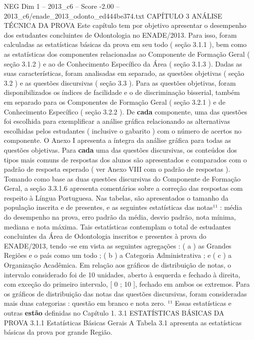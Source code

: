 \begin{textsample}{NEG Dim 1 – 2013\_c6 – Score -2.00 – 2013\_c6/enade\_2013\_odonto\_ed444be374.txt}  \label{ex:f1_neg_265}
CAPÍTULO 3 ANÁLISE TÉCNICA DA PROVA Este capítulo tem por objetivo apresentar o desempenho dos estudantes concluintes de Odontologia no ENADE/2013.
Para isso, foram calculadas as estatísticas básicas da prova em seu todo ( seção 3.1.1 ), bem como as estatísticas dos componentes relacionadas ao Componente de Formação Geral ( seção 3.1.2 ) e ao de Conhecimento Específico da Área ( seção 3.1.3 ).
Dadas as suas características, foram analisadas em separado, as questões objetivas ( seção 3.2 ) e as questões discursivas ( seção 3.3 ).
Para as questões objetivas, foram disponibilizados os índices de facilidade e o de discriminação bisserial, também em separado para os Componentes de Formação Geral ( seção 3.2.1 ) e de Conhecimento Específico ( seção 3.2.2 ).
De \textbf{cada} componente, uma das questões foi escolhida para exemplificar a análise gráfica relacionando as alternativas escolhidas pelos estudantes ( inclusive o gabarito ) com o número de acertos no componente.
O Anexo I apresenta a íntegra da análise gráfica para todas as questões objetivas.
Para \textbf{cada} uma das questões discursivas, os conteúdos dos tipos mais comuns de respostas dos alunos são apresentados e comparados com o padrão de resposta esperado ( ver Anexo VIII com o padrão de respostas ).
Tomando como base as duas questões discursivas do Componente de Formação Geral, a seção 3.3.1.6 apresenta comentários sobre a correção das respostas com respeito à Língua Portuguesa.
Nas tabelas, são apresentados o tamanho da população inscrita e de presentes, e as seguintes estatísticas das notas¹¹ : média do desempenho na prova, erro padrão da média, desvio padrão, nota mínima, mediana e nota máxima.
Tais estatísticas contemplam o total de estudantes concluintes da Área de Odontologia inscritos e presentes à prova do ENADE/2013, tendo -se em vista as seguintes agregações : ( a ) as Grandes Regiões e o país como um todo ; ( b ) a Categoria Administrativa ; e ( c ) a Organização Acadêmica.
Em relação aos gráficos de distribuição de notas, o intervalo considerado foi de 10 unidades, aberto à esquerda e fechado à direita, com exceção do primeiro intervalo, [ 0 ; 10 ], fechado em ambos os extremos.
Para os gráficos de distribuição das notas das questões discursivas, foram consideradas mais duas categorias : questão em branco e nota zero. ¹¹ Essas estatísticas e outras \textbf{estão} definidas no Capítulo 1. 3.1 ESTATÍSTICAS BÁSICAS DA PROVA 3.1.1 Estatísticas Básicas Gerais A Tabela 3.1 apresenta as estatísticas básicas da prova por grande Região.

\end{textsample}
